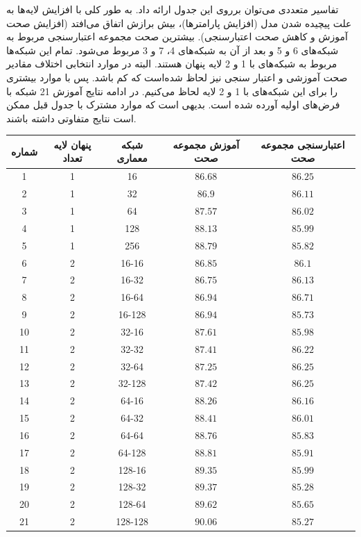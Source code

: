 \documentclass{article}
\begin{document}
تفاسیر متعددی می‌توان برروی این جدول ارائه داد. به طور کلی با افزایش لایه‌ها به علت پیچیده شدن مدل (افزایش پارامترها)، بیش برازش اتفاق می‌افتد (افزایش صحت آموزش و کاهش صحت اعتبارسنجی). بیشترین صحت مجموعه اعتبارسنجی مربوط به شبکه‌های 6 و 5 و بعد از آن به شبکه‌های 4، 7 و 3 مربوط می‌شود. تمام این شبکه‌ها مربوط به شبکه‌های با 1 و 2 لایه پنهان هستند. البته در موارد انتخابی اختلاف مقادیر صحت آموزشی و اعتبار سنجی نیز لحاظ شده‌است که کم باشد. پس با موارد بیشتری را برای این شبکه‌های با 1 و 2 لایه لحاظ می‌کنیم. در ادامه نتایج آموزش 21 شبکه با فرض‌های اولیه آورده شده است. بدیهی است که موارد مشترک با جدول قبل ممکن است نتایج متفاوتی داشته باشند.


\begin{longtable}{|c|c|c|c|c|}
    \hline
    شماره             & پنهان لایه تعداد & شبکه معماری & آموزش مجموعه صحت & اعتبارسنجی مجموعه صحت \\ \hline
    1 & 1 & 16  & $86.68$ & $86.25$ \\ \hline
    2 & 1 & 32  & $86.9$ & $86.11$ \\ \hline
    3 & 1 & 64  & $87.57$ & $86.02$ \\ \hline
    4 & 1 & 128  & $88.13$ & $85.99$ \\ \hline
    5 & 1 & 256  & $88.79$ & $85.82$ \\ \hline
    6 & 2 & 16-16  & $86.85$ & $86.1$ \\ \hline
    7 & 2 & 16-32  & $86.75$ & $86.13$ \\ \hline
    8 & 2 & 16-64  & $86.94$ & $86.71$ \\ \hline
    9 & 2 & 16-128  & $86.94$ & $85.73$ \\ \hline
    10 & 2 & 32-16  & $87.61$ & $85.98$ \\ \hline
    11 & 2 & 32-32  & $87.41$ & $86.22$ \\ \hline
    12 & 2 & 32-64  & $87.25$ & $86.25$ \\ \hline
    13 & 2 & 32-128  & $87.42$ & $86.25$ \\ \hline
    14 & 2 & 64-16  & $88.26$ & $86.16$ \\ \hline
    15 & 2 & 64-32  & $88.41$ & $86.01$ \\ \hline
    16 & 2 & 64-64  & $88.76$ & $85.83$ \\ \hline
    17 & 2 & 64-128  & $88.81$ & $85.91$ \\ \hline
    18 & 2 & 128-16  & $89.35$ & $85.99$ \\ \hline
    19 & 2 & 128-32  & $89.37$ & $85.28$ \\ \hline
    20 & 2 & 128-64  & $89.62$ & $85.65$ \\ \hline
    21 & 2 & 128-128  & $90.06$ & $85.27$ \\ \hline
\end{longtable}
\end{document}
